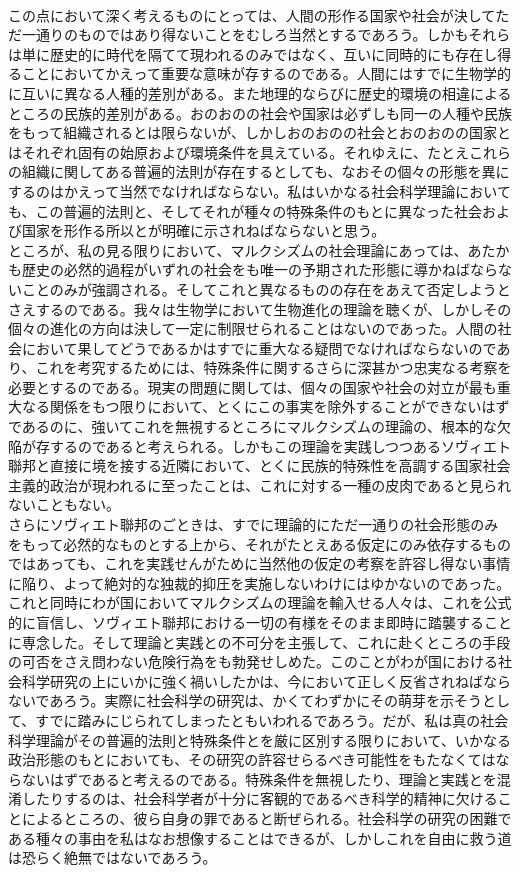 \documentclass[8pt]{extreport}
\begin{document}
\begin{CJK}{UTF8}{min}
\\	この点において深く考えるものにとっては、人間の形作る国家や社会が決してただ一通りのものではあり得ないことをむしろ当然とするであろう。しかもそれらは単に歴史的に時代を隔てて現われるのみではなく、互いに同時的にも存在し得ることにおいてかえって重要な意味が存するのである。人間にはすでに生物学的に互いに異なる人種的差別がある。また地理的ならびに歴史的環境の相違によるところの民族的差別がある。おのおのの社会や国家は必ずしも同一の人種や民族をもって組織されるとは限らないが、しかしおのおのの社会とおのおのの国家とはそれぞれ固有の始原および環境条件を具えている。それゆえに、たとえこれらの組織に関してある普遍的法則が存在するとしても、なおその個々の形態を異にするのはかえって当然でなければならない。私はいかなる社会科学理論においても、この普遍的法則と、そしてそれが種々の特殊条件のもとに異なった社会および国家を形作る所以とが明確に示されねばならないと思う。
\\	ところが、私の見る限りにおいて、マルクシズムの社会理論にあっては、あたかも歴史の必然的過程がいずれの社会をも唯一の予期された形態に導かねばならないことのみが強調される。そしてこれと異なるものの存在をあえて否定しようとさえするのである。我々は生物学において生物進化の理論を聴くが、しかしその個々の進化の方向は決して一定に制限せられることはないのであった。人間の社会において果してどうであるかはすでに重大なる疑問でなければならないのであり、これを考究するためには、特殊条件に関するさらに深甚かつ忠実なる考察を必要とするのである。現実の問題に関しては、個々の国家や社会の対立が最も重大なる関係をもつ限りにおいて、とくにこの事実を除外することができないはずであるのに、強いてこれを無視するところにマルクシズムの理論の、根本的な欠陥が存するのであると考えられる。しかもこの理論を実践しつつあるソヴィエト聯邦と直接に境を接する近隣において、とくに民族的特殊性を高調する国家社会主義的政治が現われるに至ったことは、これに対する一種の皮肉であると見られないこともない。
\\	さらにソヴィエト聯邦のごときは、すでに理論的にただ一通りの社会形態のみをもって必然的なものとする上から、それがたとえある仮定にのみ依存するものではあっても、これを実践せんがために当然他の仮定の考察を許容し得ない事情に陥り、よって絶対的な独裁的抑圧を実施しないわけにはゆかないのであった。これと同時にわが国においてマルクシズムの理論を輸入せる人々は、これを公式的に盲信し、ソヴィエト聯邦における一切の有様をそのまま即時に踏襲することに専念した。そして理論と実践との不可分を主張して、これに赴くところの手段の可否をさえ問わない危険行為をも勃発せしめた。このことがわが国における社会科学研究の上にいかに強く禍いしたかは、今において正しく反省されねばならないであろう。実際に社会科学の研究は、かくてわずかにその萌芽を示そうとして、すでに踏みにじられてしまったともいわれるであろう。だが、私は真の社会科学理論がその普遍的法則と特殊条件とを厳に区別する限りにおいて、いかなる政治形態のもとにおいても、その研究の許容せらるべき可能性をもたなくてはならないはずであると考えるのである。特殊条件を無視したり、理論と実践とを混淆したりするのは、社会科学者が十分に客観的であるべき科学的精神に欠けることによるところの、彼ら自身の罪であると断ぜられる。社会科学の研究の困難である種々の事由を私はなお想像することはできるが、しかしこれを自由に救う道は恐らく絶無ではないであろう。

\end{CJK}
\end{document}

